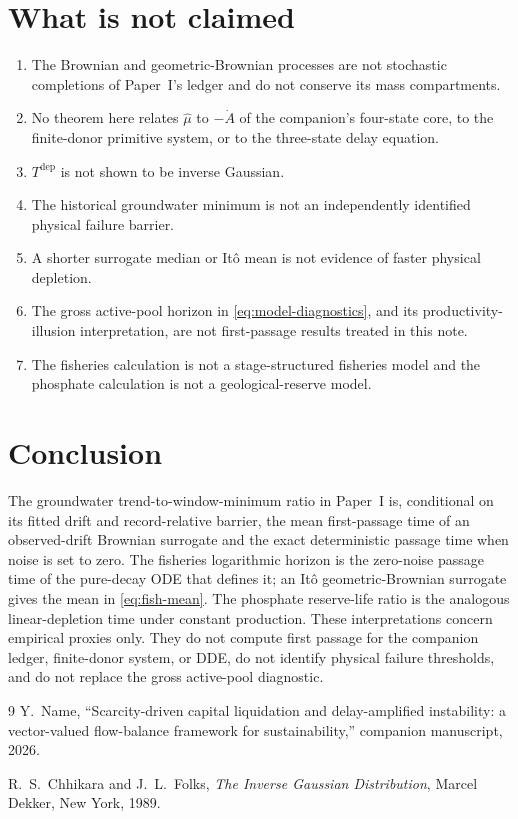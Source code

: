 \documentclass[11pt]{article}
\theoremstyle{definition}
\begin{document}
\section{What is not claimed}
\label{sec:not-claimed}

\begin{enumerate}
\item The Brownian and geometric-Brownian processes are not stochastic completions of Paper~I's ledger and do not conserve its mass compartments.
\item No theorem here relates $\widehat\mu$ to $-\dot A$ of the companion's four-state core, to the finite-donor primitive system, or to the three-state delay equation.
\item $T^{\mathrm{dep}}$ is not shown to be inverse Gaussian.
\item The historical groundwater minimum is not an independently identified physical failure barrier.
\item A shorter surrogate median or It\^o mean is not evidence of faster physical depletion.
\item The gross active-pool horizon in \eqref{eq:model-diagnostics}, and its productivity-illusion interpretation, are not first-passage results treated in this note.
\item The fisheries calculation is not a stage-structured fisheries model and the phosphate calculation is not a geological-reserve model.
\end{enumerate}

\section{Conclusion}

The groundwater trend-to-window-minimum ratio in Paper~I is, conditional on its fitted drift and record-relative barrier, the mean first-passage time of an observed-drift Brownian surrogate and the exact deterministic passage time when noise is set to zero. The fisheries logarithmic horizon is the zero-noise passage time of the pure-decay ODE that defines it; an It\^o geometric-Brownian surrogate gives the mean in \eqref{eq:fish-mean}. The phosphate reserve-life ratio is the analogous linear-depletion time under constant production. These interpretations concern empirical proxies only. They do not compute first passage for the companion ledger, finite-donor system, or DDE, do not identify physical failure thresholds, and do not replace the gross active-pool diagnostic.

\begin{thebibliography}{9}
Y.~Name, ``Scarcity-driven capital liquidation and delay-amplified instability: a vector-valued flow-balance framework for sustainability,'' companion manuscript, 2026.

R.~S.~Chhikara and J.~L.~Folks, \emph{The Inverse Gaussian Distribution}, Marcel Dekker, New York, 1989.
\end{thebibliography}
\end{document}
